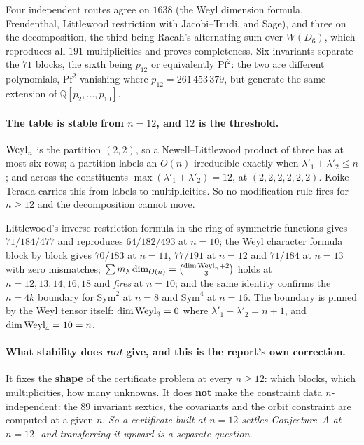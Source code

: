 \noindent Four independent routes agree on $1638$ (the Weyl dimension formula, Freudenthal, Littlewood restriction with Jacobi--Trudi, and Sage), and three on the decomposition, the third being Racah's alternating sum over $W(D_6)$, which reproduces all $191$ multiplicities and proves completeness. Six invariants separate the $71$ blocks, the sixth being $p_{12}$ or equivalently $\mathrm{Pf}^2$: the two are different polynomials, $\mathrm{Pf}^2$ vanishing where $p_{12}=261\,453\,379$, but generate the same extension of $\mathbb Q[p_2,\dots,p_{10}]$.

\paragraph{The table is stable from $n=12$, and $12$ is the threshold.} $\mathrm{Weyl}_n$ is the partition $(2,2)$, so a Newell--Littlewood product of three has at most six rows; a partition labels an $O(n)$ irreducible exactly when $\lambda'_1+\lambda'_2\le n$; and across the constituents $\max(\lambda'_1+\lambda'_2)=12$, at $(2,2,2,2,2,2)$. Koike--Terada carries this from labels to multiplicities. So no modification rule fires for $n\ge12$ and the decomposition cannot move.

\begin{certificate}
Littlewood's inverse restriction formula in the ring of symmetric functions gives $71/184/477$ and reproduces $64/182/493$ at $n=10$; the Weyl character formula block by block gives $70/183$ at $n=11$, $77/191$ at $n=12$ and $71/184$ at $n=13$ with zero mismatches; $\sum m_\lambda\dim_{O(n)}=\binom{\dim\mathrm{Weyl}_n+2}{3}$ holds at $n=12,13,14,16,18$ and \emph{fires} at $n=10$; and the same identity confirms the $n=4k$ boundary for $\mathrm{Sym}^2$ at $n=8$ and $\mathrm{Sym}^4$ at $n=16$. The boundary is pinned by the Weyl tensor itself: $\dim\mathrm{Weyl}_3=0$ where $\lambda'_1+\lambda'_2=n+1$, and $\dim\mathrm{Weyl}_4=10=n$.
\end{certificate}

\paragraph{What stability does \emph{not} give, and this is the report's own correction.} It fixes the \textbf{shape} of the certificate problem at every $n\ge12$: which blocks, which multiplicities, how many unknowns. It does \textbf{not} make the constraint data $n$-independent: the $89$ invariant sextics, the covariants and the orbit constraint are computed at a given $n$. \emph{So a certificate built at $n=12$ settles Conjecture~A at $n=12$, and transferring it upward is a separate question.}

